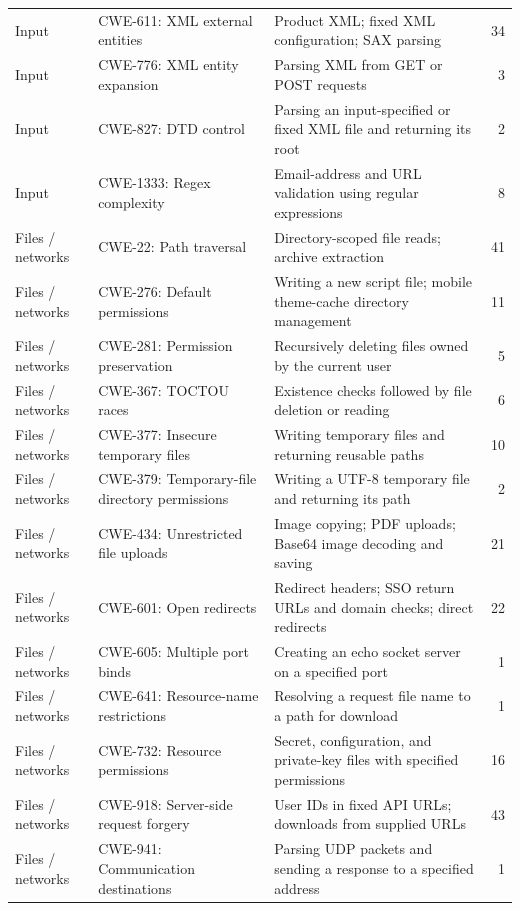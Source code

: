 \begin{longtable}{@{}>{\raggedright\arraybackslash}p{.13\linewidth} >{\raggedright\arraybackslash}p{.25\linewidth} >{\raggedright\arraybackslash}p{} r@{}}
Input & CWE-611: XML external entities & Product XML; fixed XML configuration; SAX parsing & 34 \\
Input & CWE-776: XML entity expansion & Parsing XML from GET or POST requests & 3 \\
Input & CWE-827: DTD control & Parsing an input-specified or fixed XML file and returning its root & 2 \\
Input & CWE-1333: Regex complexity & Email-address and URL validation using regular expressions & 8 \\
\midrule
Files / networks & CWE-22: Path traversal & Directory-scoped file reads; archive extraction & 41 \\
Files / networks & CWE-276: Default permissions & Writing a new script file; mobile theme-cache directory management & 11 \\
Files / networks & CWE-281: Permission preservation & Recursively deleting files owned by the current user & 5 \\
Files / networks & CWE-367: TOCTOU races & Existence checks followed by file deletion or reading & 6 \\
Files / networks & CWE-377: Insecure temporary files & Writing temporary files and returning reusable paths & 10 \\
Files / networks & CWE-379: Temporary-file directory permissions & Writing a UTF-8 temporary file and returning its path & 2 \\
Files / networks & CWE-434: Unrestricted file uploads & Image copying; PDF uploads; Base64 image decoding and saving & 21 \\
Files / networks & CWE-601: Open redirects & Redirect headers; SSO return URLs and domain checks; direct redirects & 22 \\
Files / networks & CWE-605: Multiple port binds & Creating an echo socket server on a specified port & 1 \\
Files / networks & CWE-641: Resource-name restrictions & Resolving a request file name to a path for download & 1 \\
Files / networks & CWE-732: Resource permissions & Secret, configuration, and private-key files with specified permissions & 16 \\
Files / networks & CWE-918: Server-side request forgery & User IDs in fixed API URLs; downloads from supplied URLs & 43 \\
Files / networks & CWE-941: Communication destinations & Parsing UDP packets and sending a response to a specified address & 1 \\

\end{longtable}
